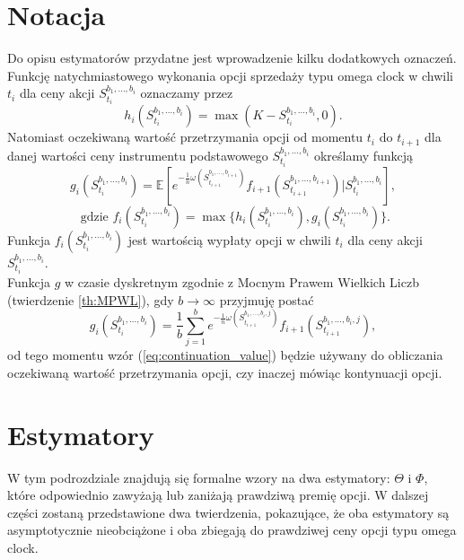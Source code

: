 \documentclass[]{pwr_wmat_praca_dyplomowa}
\theoremstyle{plain}
\numberwithin{theorem}{chapter}
\theoremstyle{definition}
\numberwithin{theorem}{chapter}
\begin{document}
\section{Notacja}
Do opisu estymatorów przydatne jest wprowadzenie kilku dodatkowych oznaczeń.\\
\newline
Funkcję natychmiastowego wykonania opcji sprzedaży typu omega clock w chwili $t_i$ dla ceny akcji $S_{t_i}^{b_1,\ldots,b_i}$ oznaczamy przez
\begin{equation*}
h_i(S_{t_i}^{b_1,\ldots,b_i}) = \max(K-S_{t_i}^{b_1,\ldots,b_i},0).
\end{equation*}
Natomiast oczekiwaną wartość przetrzymania opcji od momentu $t_i$ do $t_{i+1}$ dla danej wartości ceny instrumentu podstawowego $S_{t_i}^{b_1,\ldots,b_i}$ określamy funkcją 
\begin{equation*}
g_i(S_{t_i}^{b_1,\ldots,b_i}) = \mathbb{E}[e^{-\frac{1}{n}\omega(S_{t_{i+1}}^{b_1,\ldots,b_{i+1}})}f_{i+1}(S_{t_{i+1}}^{b_1,\ldots,b_{i+1}})|S_{t_i}^{b_1,\ldots,b_i}],
\end{equation*}
\begin{equation*}
\textrm{ gdzie }f_i(S_{t_i}^{b_1,\ldots,b_i}) = \max\{h_i(S_{t_i}^{b_1,\ldots,b_i}),g_i(S_{t_i}^{b_1,\ldots,b_i})\}.
\end{equation*}
Funkcja $f_i(S_{t_i}^{b_1,\ldots,b_i})$ jest wartością wypłaty opcji w chwili $t_i$ dla ceny akcji $S_{t_i}^{b_1,\ldots,b_i}$.\\
Funkcja $g$ w czasie dyskretnym zgodnie z Mocnym Prawem Wielkich Liczb (twierdzenie \ref{th:MPWL}), gdy $b \rightarrow \infty$ przyjmuję postać
\begin{equation}
\label{eq:continuation_value}
g_i(S_{t_i}^{b_1,\ldots,b_i}) = \frac{1}{b}\sum_{j=1}^b e^{-\frac{1}{n}\omega(S_{t_{i+1}}^{b_1,\ldots,b_{i},j})}f_{i+1}(S_{t_{i+1}}^{b_1,\ldots,b_{i},j}),
\end{equation}
od tego momentu wzór (\ref{eq:continuation_value}) będzie używany do obliczania oczekiwaną wartość przetrzymania opcji, czy inaczej mówiąc kontynuacji opcji.
\section{Estymatory}
W tym podrozdziale znajdują się formalne wzory na dwa estymatory: $\Theta$ i $\Phi$, które odpowiednio zawyżają lub zaniżają prawdziwą premię opcji. W dalszej części zostaną przedstawione dwa twierdzenia, pokazujące, że oba estymatory są asymptotycznie nieobciążone i oba zbiegają do prawdziwej ceny opcji typu omega clock.
\end{document}
